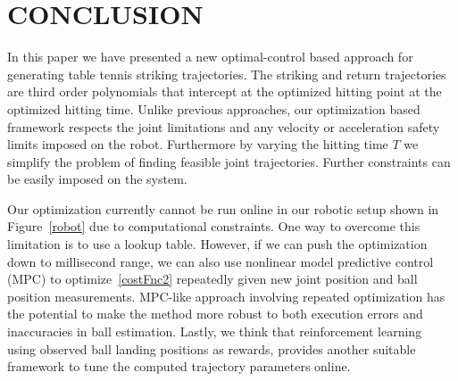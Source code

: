 \section{CONCLUSION}\label{end}

In this paper we have presented a new optimal-control based approach for generating table tennis striking trajectories. The striking and return trajectories are third order polynomials that intercept at the optimized hitting point at the optimized hitting time. Unlike previous approaches, our optimization based framework respects the joint limitations and any velocity or acceleration safety limits imposed on the robot. Furthermore by varying the hitting time $T$ we simplify the problem of finding feasible joint trajectories. Further constraints can be easily imposed on the system.

Our optimization currently cannot be run online in our robotic setup shown in Figure~\ref{robot} due to computational constraints. One way to overcome this limitation is to use a lookup table. However, if we can push the optimization down to millisecond range, we can also use nonlinear model predictive control (MPC) to optimize~\eqref{costFnc2} repeatedly given new joint position and ball position measurements. MPC-like approach involving repeated optimization has the potential to make the method more robust to both execution errors and inaccuracies in ball estimation. Lastly, we think that reinforcement learning~\cite{Sutton98} using observed ball landing positions as rewards, provides another suitable framework to tune the computed trajectory parameters online.

